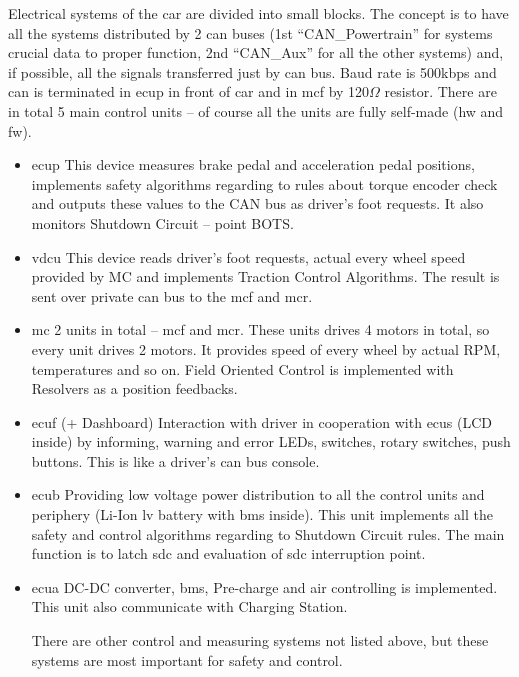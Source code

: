 
Electrical systems of the car are divided into small blocks. The concept is to have all the systems distributed by 2 \gls{can} buses (1st “CAN\_Powertrain” for systems crucial data to proper function, 2nd “CAN\_Aux” for all the other systems) and, if possible, all the signals transferred just by \gls{can} bus. Baud rate is 500kbps and \gls{can} is terminated in \gls{ecup} in front of car and in \gls{mcf} by 120$\Omega$ resistor. There are in total 5 main control units – of course all the units are fully self-made (\gls{hw} and \gls{fw}).

\begin{itemize}
\item	\Glsdesc{ecup}
This device measures brake pedal and acceleration pedal positions, implements safety algorithms regarding to rules about torque encoder check and outputs these values to the CAN bus as driver’s foot requests. It also monitors Shutdown Circuit – point BOTS. 

\item	\Glsdesc{vdcu}
This device reads driver’s foot requests, actual every wheel speed provided by MC and implements Traction Control Algorithms. The result is sent over private \gls{can} bus to the \gls{mcf} and \gls{mcr}. 

\item	\Glsdesc{mc}
2 units in total – \gls{mcf} and \gls{mcr}. These units drives 4 motors in total, so every unit drives 2 motors. It provides speed of every wheel by actual RPM, temperatures and so on. Field Oriented Control is implemented with Resolvers as a position feedbacks.

\item	\Glsdesc{ecuf} (+ Dashboard)
Interaction with driver in cooperation with \gls{ecus} (LCD inside) by informing, warning and error LEDs, switches, rotary switches, push buttons. This is like a driver’s \gls{can} bus console. 

\item	\Glsdesc{ecub}
Providing low voltage power distribution to all the control units and periphery (Li-Ion \gls{lv} battery with \gls{bms} inside). This unit implements all the safety and control algorithms regarding to Shutdown Circuit rules. The main function is to latch \gls{sdc} and evaluation of \gls{sdc} interruption point. 

\item	\Glsdesc{ecua}
DC-DC converter, \gls{bms}, Pre-charge and \gls{air} controlling is implemented. This unit also communicate with Charging Station.

There are other control and measuring systems not listed above, but these systems are most important for safety and control.

\end{itemize}

